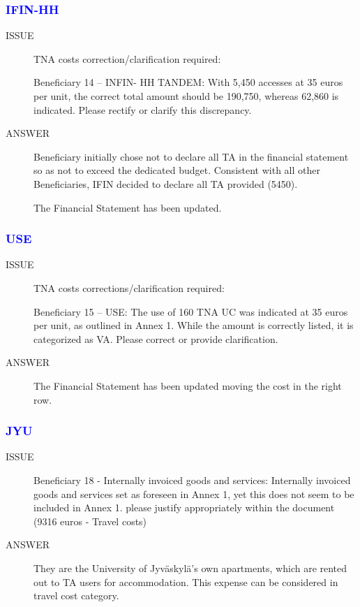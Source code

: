 \begin{prtwo}
\subsubsection*{\textcolor{blue}{IFIN-HH}}
\begin{description}
    \item[ISSUE] TNA costs correction/clarification required:
    
Beneficiary 14 – INFIN- HH TANDEM: With 5,450 accesses at 35 euros per unit, the correct total amount should be 190,750, whereas 62,860 is indicated. Please rectify or clarify this discrepancy.


    \item[ANSWER] Beneficiary initially chose not to declare all TA in the financial statement so as not to exceed the dedicated budget. Consistent with all other Beneficiaries, IFIN decided to declare all TA provided (5450).
    
The Financial Statement has been updated.

\end{description}
\end{prtwo}

\begin{prtwo}
\subsubsection*{\textcolor{blue}{USE}}
\begin{description}
    \item[ISSUE] TNA costs corrections/clarification required:
    
Beneficiary 15 – USE: The use of 160 TNA UC was indicated at 35 euros per unit, as outlined in Annex 1. While the amount is correctly listed, it is categorized as VA. Please correct or provide clarification.

    \item[ANSWER] The Financial Statement has been updated moving the cost in the right row.

\end{description}
\end{prtwo}

\begin{prtwo}
\subsubsection*{\textcolor{blue}{JYU}}
\begin{description}
    \item[ISSUE] Beneficiary 18 - Internally invoiced goods and services:
Internally invoiced goods and services set as foreseen in Annex 1, yet this does not seem to be included in Annex 1. please justify appropriately within the document (9316 euros - Travel costs)


    \item[ANSWER] They are the University of Jyväskylä's own apartments, which are rented out to TA users for accommodation. This expense can be considered in travel cost category.

\end{description}
\end{prtwo}


